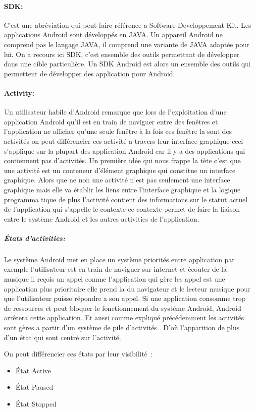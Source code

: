 \paragraph{SDK:}
C’est une abréviation qui peut faire référence a Software Developpement Kit.
Les applications Android sont développés en JAVA. Un appareil Android ne
comprend pas le langage JAVA, il comprend une variante de JAVA adaptée pour lui.
On a recours ici SDK, c'est ensemble des outils permettant de développer dans
une cible particulière. Un SDK Android est alors un ensemble des outils qui
permettent de développer des application pour Android.

\paragraph{Activity:}
Un utilisateur habile d'Android remarque que lors de l'exploitation d'une
application Android qu'il est en train de naviguer entre des fenêtres et
l'application ne afficher qu'une seule fenêtre à la fois ces fenêtre la sont
des activités on peut différencier ces activité a travers leur interface
graphique ceci s'applique sur la plupart des application Android car il y a
des applications qui contiennent pas d'activités. Un première idée qui nous
frappe la tète c'est que une activité est un conteneur d'élément graphique qui
constitue un interface graphique. Alors que ne non une activité n'est pas
seulement une interface graphique mais elle va établir les liens entre
l'interface graphique et la logique programma tique de plus l'activité
contient des informations sur le statut actuel de l'application qui s'appelle le
contexte ce contexte permet de faire la liaison entre le système Android et les
autres activities de l'application.

\subparagraph{États d'activities:}
Le système Android met en place un système priorités entre application
par exemple l'utilisateur est en train de naviguer sur internet et écouter
de la musique il reçois un appel comme l'application qui gère les appel est
une application plus prioritaire elle prend la du navigateur et le lecteur
musique pour que l'utilisateur puisse répondre a son appel. Si une application
consomme trop de ressources et peut bloquer le fonctionnement du système Android,
Android arrêtera cette application. Et aussi comme expliqué précédemment
les activités sont gères a partir d'un système de pile d'activités .
D'où l'apparition de plus d'un état qui sont centré sur l'activité.

On peut différencier ces états par leur visibilité :
\begin{itemize}
 \item État Active
 \item État Paused
 \item État Stopped
\end{itemize}

